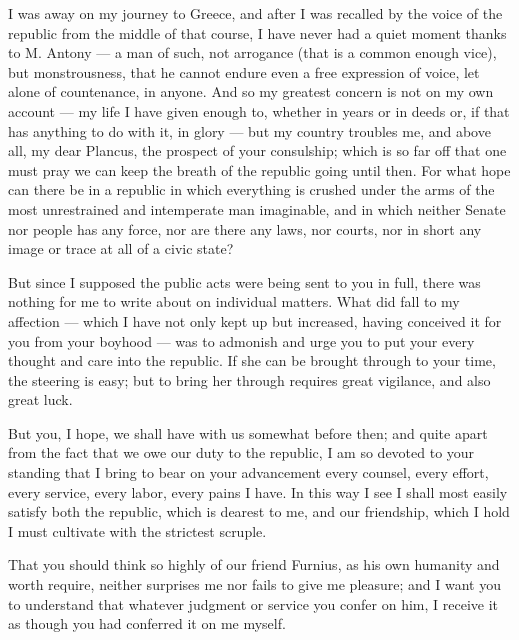

 I was away on my journey to Greece, and after I was recalled by the voice of the republic from the middle of that course, I have never had a quiet moment thanks to M. Antony --- a man of such, not arrogance (that is a common enough vice), but monstrousness, that he cannot endure even a free expression of voice, let alone of countenance, in anyone. And so my greatest concern is not on my own account --- my life I have given enough to, whether in years or in deeds or, if that has anything to do with it, in glory --- but my country troubles me, and above all, my dear Plancus, the prospect of your consulship; which is so far off that one must pray we can keep the breath of the republic going until then. For what hope can there be in a republic in which everything is crushed under the arms of the most unrestrained and intemperate man imaginable, and in which neither Senate nor people has any force, nor are there any laws, nor courts, nor in short any image or trace at all of a civic state?

 But since I supposed the public acts were being sent to you in full, there was nothing for me to write about on individual matters. What did fall to my affection --- which I have not only kept up but increased, having conceived it for you from your boyhood --- was to admonish and urge you to put your every thought and care into the republic. If she can be brought through to your time, the steering is easy; but to bring her through requires great vigilance, and also great luck.

 But you, I hope, we shall have with us somewhat before then; and quite apart from the fact that we owe our duty to the republic, I am so devoted to your standing that I bring to bear on your advancement every counsel, every effort, every service, every labor, every pains I have. In this way I see I shall most easily satisfy both the republic, which is dearest to me, and our friendship, which I hold I must cultivate with the strictest scruple.

 That you should think so highly of our friend Furnius, as his own humanity and worth require, neither surprises me nor fails to give me pleasure; and I want you to understand that whatever judgment or service you confer on him, I receive it as though you had conferred it on me myself.
